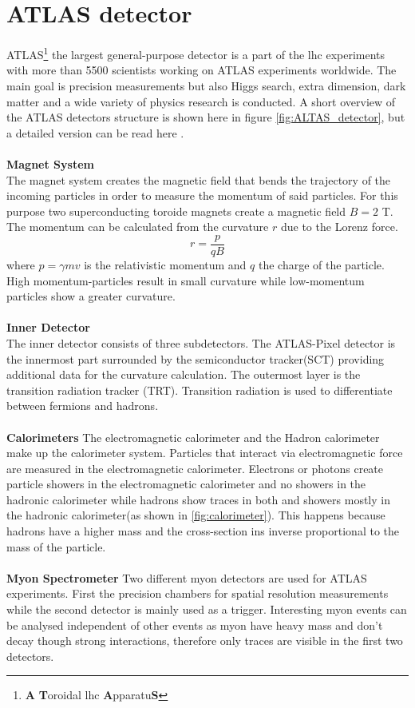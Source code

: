 \documentclass[../Bachelorarbeit.tex]{subfiles}
\begin{document}
\section{ATLAS detector}
ATLAS\footnote{\textbf{A} \textbf{T}oroidal \acrshort{lhc} \textbf{A}pparatu\textbf{S}} the largest general-purpose detector is a part of the \acrshort{lhc} experiments with more than 5500 scientists working on
ATLAS experiments worldwide. The main goal is precision measurements but also Higgs search, extra dimension, dark matter and a wide variety of physics research is conducted.
A short overview of the ATLAS detectors structure is shown here in figure \ref{fig:ALTAS_detector}, but a detailed version can be read here \cite{Evans.2008}.
\\\\
\textbf{Magnet System}\\
The magnet system creates the magnetic field that bends the trajectory of the incoming particles in order to measure the momentum of said particles.
For this purpose two superconducting toroide magnets create a magnetic field $B=2$ T. The momentum can be calculated from the curvature $r$ due to the Lorenz force.
\begin{equation}
    r=\frac{p}{q B}
\end{equation}
where $p=\gamma m v$ is the relativistic momentum and $q$ the charge of the particle. High momentum-particles result in small curvature while low-momentum particles show a greater curvature.
\\\\
\textbf{Inner Detector}\\
The inner detector consists of three subdetectors. The ATLAS-Pixel detector is the innermost part surrounded by the semiconductor tracker(SCT) providing additional data for the curvature calculation.
The outermost layer is the transition radiation tracker (TRT). Transition radiation is used to differentiate between fermions and hadrons.
\\\\
\textbf{Calorimeters}
The electromagnetic calorimeter and the Hadron calorimeter make up the calorimeter system. Particles that interact via electromagnetic force are measured in
the electromagnetic calorimeter. Electrons or photons create particle showers in the electromagnetic calorimeter and no showers in the hadronic calorimeter while hadrons show traces in both and showers mostly in the hadronic calorimeter(as shown in \ref{fig:calorimeter}).
This happens because hadrons have a higher mass and the cross-section ins inverse proportional to the mass of the particle.
\\\\
\textbf{Myon Spectrometer}
Two different myon detectors are used for ATLAS experiments. First the precision chambers for spatial resolution measurements while the second detector is mainly used as a trigger. Interesting myon events can be analysed
independent of other events as myon have heavy mass and don't decay though strong interactions, therefore only traces are visible in the first two detectors.
\end{document}

